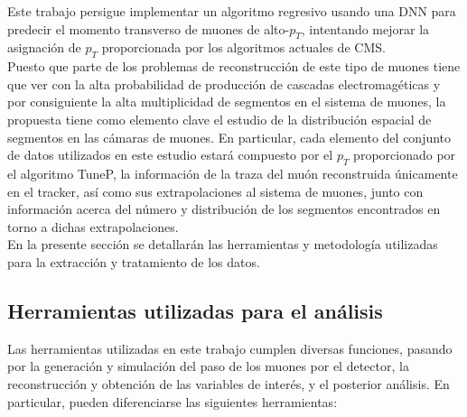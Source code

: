 Este trabajo persigue implementar un algoritmo regresivo usando una DNN para predecir el momento transverso de muones de alto-$p_{T}$, intentando mejorar la asignaci\'on de $p_{T}$ proporcionada por los algoritmos actuales de CMS. \\

Puesto que parte de los problemas de reconstrucci\'on de este tipo de muones tiene que ver con la alta probabilidad de producci\'on de cascadas electromag\'eticas y por consiguiente la alta multiplicidad de segmentos en el sistema de muones, la propuesta tiene como elemento clave el estudio de la  distribuci\'on espacial de segmentos en las c\'amaras de muones. En particular, cada elemento del conjunto de datos utilizados en este estudio estar\'a compuesto por el $p_{T}$ proporcionado por el algoritmo TuneP, la informaci\'on de la traza del mu\'on reconstruida \'unicamente en el tracker, as\'i como sus extrapolaciones al sistema de muones, junto con informaci\'on acerca del n\'umero y distribuci\'on de los segmentos encontrados en torno a dichas extrapolaciones. \\

En la presente secci\'on se detallar\'an las herramientas y metodolog\'ia utilizadas para la extracci\'on y tratamiento de los datos.


\subsection{Herramientas utilizadas para el an\'alisis}\label{sec:tools}

Las herramientas utilizadas en este trabajo cumplen diversas funciones, pasando por la generaci\'on y simulaci\'on del paso de los muones por el detector, la reconstrucci\'on y obtenci\'on de las variables de inter\'es, y el posterior an\'alisis. En particular, pueden diferenciarse las siguientes herramientas:  


